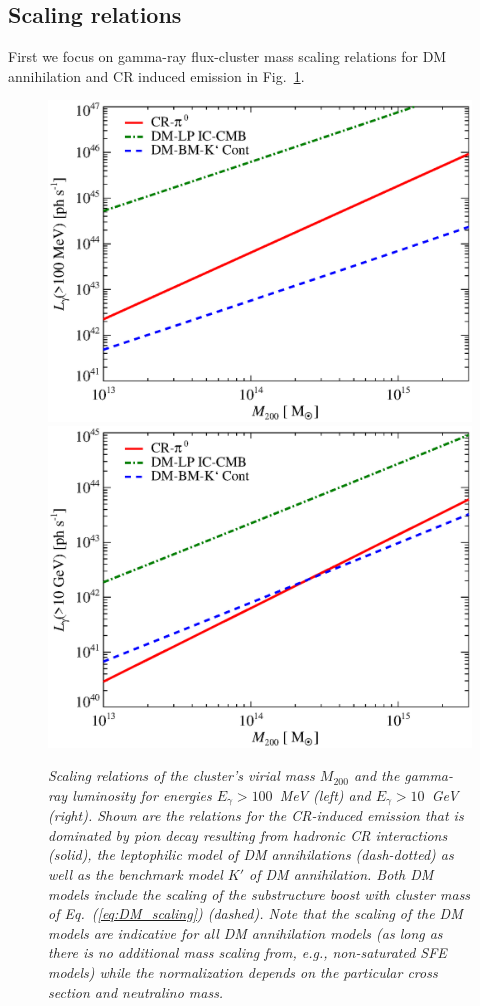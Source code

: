 \documentclass[10pt,aps,pra,reprint,amsmath,amsfonts,amssymb,showpacs,nofootinbib,floatfix]{revtex4-1}
\newcommand{\mvir}{M_{200}}
\begin{document}
\subsection{Scaling relations}
First we focus on gamma-ray flux-cluster mass scaling relations for DM
annihilation and CR induced emission in
Fig.~\ref{fig:lum_mass_scaling}.  
\begin{figure}
  \includegraphics[width=0.99\columnwidth]{figures/MLscaling.100M.eps}
  \includegraphics[width=0.99\columnwidth]{figures/MLscaling.10G.eps}
  \caption{\it Scaling relations of the cluster's virial mass $\mvir$
    and the gamma-ray luminosity for energies $E_\gamma>100$~MeV
    (left) and $E_\gamma>10$~GeV (right).  Shown are the relations for
    the CR-induced emission that is dominated by pion decay resulting
    from hadronic CR interactions (solid), the leptophilic model of DM
    annihilations (dash-dotted) as well as the benchmark model $K'$ of
    DM annihilation. Both DM models include the scaling of the
    substructure boost with cluster mass of Eq.~(\ref{eq:DM_scaling})
    (dashed). Note that the scaling of the DM models are indicative
    for all DM annihilation models (as long as there is no additional
    mass scaling from, e.g., non-saturated SFE models) while the
    normalization depends on the particular cross section and
    neutralino mass.}
\label{fig:lum_mass_scaling}
\end{figure}
\end{document}
